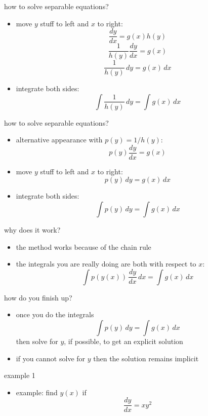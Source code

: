 \documentclass{beamer}
\begin{document}
\begin{frame}{how to solve separable equations?}

\begin{itemize}
\item move $y$ stuff to left and $x$ to right:
        $$\frac{dy}{dx} = g(x) h(y)$$
    $$\frac{1}{h(y)} \frac{dy}{dx} = g(x)$$
    $$\frac{1}{h(y)}\,dy = g(x)\,dx$$
\item<2> integrate both sides:
    $$\int \frac{1}{h(y)}\,dy = \int g(x)\, dx$$
\end{itemize}
\end{frame}


\begin{frame}{how to solve separable equations?}

\begin{itemize}
\item alternative appearance with $p(y)=1/h(y)$:
        $$p(y) \frac{dy}{dx} = g(x)$$
\item<2> move $y$ stuff to left and $x$ to right:
    $$p(y) \,dy = g(x)\,dx$$
\item<2> integrate both sides:
    $$\int p(y)\,dy = \int g(x)\, dx$$
\end{itemize}
\end{frame}


\begin{frame}{why does it work?}

\begin{itemize}
\item the method works because of the chain rule
\item the integrals you are really doing are both with respect to $x$:
    $$\int p(y(x))\,\frac{dy}{dx}\,dx = \int g(x)\, dx$$
\end{itemize}
\end{frame}


\begin{frame}{how do you finish up?}

\begin{itemize}
\item once you do the integrals
    $$\int p(y)\,dy = \int g(x)\, dx$$
then solve for $y$, if possible, to get an explicit solution
\item if you cannot solve for $y$ then the solution remains implicit
\end{itemize}
\end{frame}


\begin{frame}{example 1}
\begin{itemize}
\item example: find $y(x)$ if
    $$\frac{dy}{dx} = x y^2$$
\end{itemize}

\vspace{50mm}
\end{frame}
\end{document}
